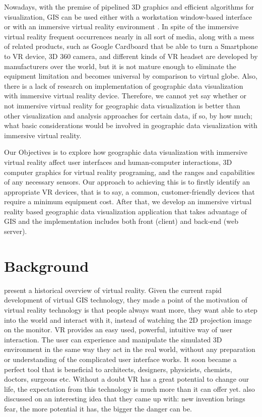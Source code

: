Nowadays, with the premise of pipelined 3D graphics and efficient algorithms for visualization, GIS can be used either with a workstation window-based interface or with an immersive virtual reality environment \cite{koller.virtual-gis.1995}. In spite of the immersive virtual reality frequent occurrences nearly in all sort of media, along with a mess of related products, such as Google Cardboard that be able to turn a Smartphone to VR device, 3D 360 camera, and different kinds of VR headset are developed by manufacturers over the world, but it is not mature enough to eliminate the equipment limitation and becomes universal by comparison to virtual globe. Also, there is a lack of research on implementation of geographic data visualization with immersive virtual reality device. Therefore, we cannot yet say whether or not immersive virtual reality for geographic data visualization is better than other visualization and analysis approaches for certain data, if so, by how much; what basic considerations would be involved in geographic data visualization with immersive virtual reality.

Our Objectives is to explore how geographic data visualization with immersive virtual reality affect user interfaces and human-computer interactions, 3D computer graphics for virtual reality programing, and the ranges and capabilities of any necessary sensors. Our approach to achieving this is to firstly identify an appropriate VR devices, that is to say, a common, customer-friendly devices that require a minimum equipment cost. After that, we develop an immersive virtual reality based geographic data visualization application that takes advantage of GIS and the implementation includes both front (client) and back-end (web server).

\section{Background}
\label{section:background}

\cite{mazuryk.vr.1996} present a historical overview of virtual reality. Given the current rapid development of virtual GIS technology, they made a point of the motivation of virtual reality technology is that people always want more, they want able to step into the world and interact with it, instead of watching the 2D projection image on the monitor. VR provides an easy used, powerful, intuitive way of user interaction. The user can experience and manipulate the simulated 3D environment in the same way they act in the real world, without any preparation or understanding of the complicated user interface works. It soon became a perfect tool that is beneficial to architects, designers, physicists, chemists, doctors, surgeons etc. Without a doubt VR has a great potential to change our life, the expectation from this technology is much more than it can offer yet. \cite{mazuryk.vr.1996} also discussed on an interesting idea that they came up with: new invention brings fear, the more potential it has, the bigger the danger can be.

